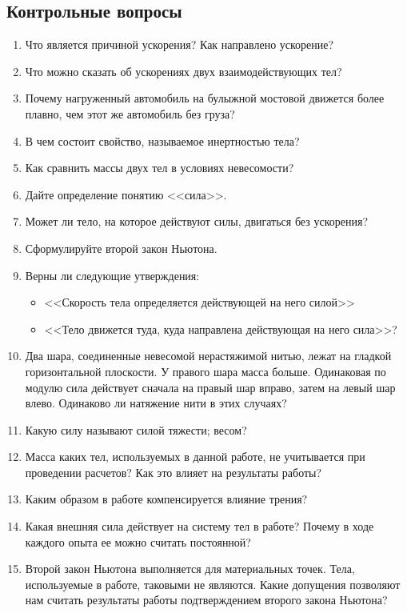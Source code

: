 \documentclass[a4paper, 12pt]{extarticle}
\begin{document}
\subsection{Контрольные вопросы}
\begin{enumerate}
\item Что является причиной ускорения? Как направлено ускорение?
\item Что можно сказать об ускорениях двух взаимодействующих тел?
\item Почему нагруженный автомобиль на булыжной мостовой движется более плавно, чем этот же автомобиль без груза?  %
\item В чем состоит свойство, называемое инертностью тела?
\item Как сравнить массы двух тел в условиях невесомости?
\item Дайте определение понятию <<сила>>. 
\item Может ли тело, на которое действуют силы, двигаться без ускорения? 
\item Сформулируйте второй закон Ньютона.
\item Верны ли следующие утверждения:
	\begin{itemize}
	\item <<Скорость тела определяется действующей на него силой>> 
	\item <<Тело движется туда, куда направлена действующая на него сила>>?
	\end{itemize}
\item Два шара, соединенные невесомой нерастяжимой нитью, лежат на гладкой горизонтальной плоскости. У правого шара масса больше. Одинаковая по модулю сила действует сначала на правый шар вправо, затем на левый шар влево. Одинаково ли натяжение нити в этих случаях? 
\item Какую силу называют силой тяжести; весом?
\item Масса каких тел, используемых в данной работе, не учитывается при проведении расчетов? Как это влияет на результаты работы? 
\item Каким образом в работе компенсируется влияние трения?
\item Какая внешняя сила действует на систему тел в работе? Почему в ходе каждого опыта ее можно считать постоянной? 
\item Второй закон Ньютона выполняется для материальных точек. Тела, используемые в работе, таковыми не являются. Какие допущения позволяют нам считать результаты работы подтверждением второго закона Ньютона?
\end{enumerate}
\end{document}
